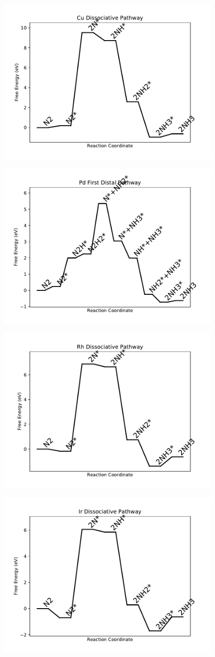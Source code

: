\begin{figure}
\includegraphics[width=0.5\linewidth]{data/plots/Cu_dissociative.pdf}
\label{fig:Cu_dissociative}
\end{figure}

\begin{figure}
\includegraphics[width=0.5\linewidth]{data/plots/Pd_distal_1.pdf}
\label{fig:Pd_distal_1}
\end{figure}

\begin{figure}
\includegraphics[width=0.5\linewidth]{data/plots/Rh_dissociative.pdf}
\label{fig:Rh_dissociative}
\end{figure}

\begin{figure}
\includegraphics[width=0.5\linewidth]{data/plots/Ir_dissociative.pdf}
\label{fig:Ir_dissociative}
\end{figure}

